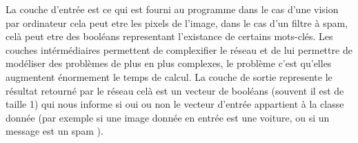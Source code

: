 
La couche d'entrée est ce qui est fourni au programme dans le cas d'une vision par ordinateur cela peut etre les pixels de l'image, dans le cas d'un filtre à spam, celà peut etre des booléans representant l'existance de certains mots-clés.
Les couches intérmédiaires permettent de complexifier le réseau et de lui permettre de modéliser des problèmes de plus en plus complexes, le problème c'est qu'elles augmentent énormement le temps de calcul.
La couche de sortie represente le résultat retourné par le réseau celà est un vecteur de booléans (souvent il est de taille 1) qui nous informe si oui ou non le vecteur d'entrée appartient à la classe donnée (par exemple si une image donnée en entrée est une voiture, ou si un message est un spam ).

